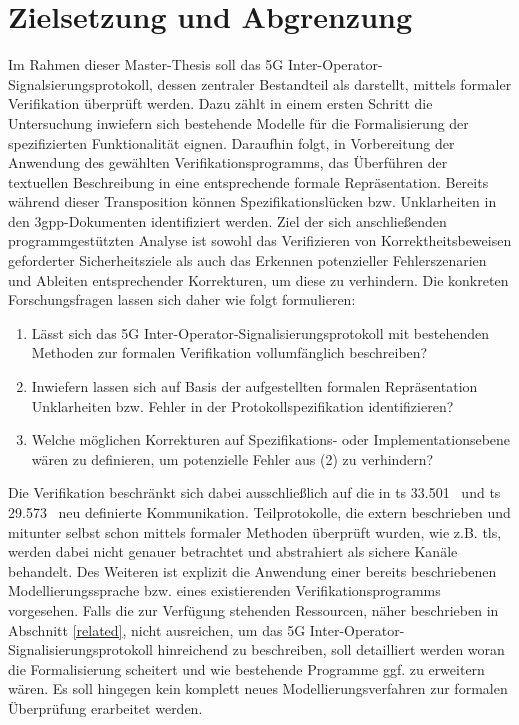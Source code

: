 \section{Zielsetzung und Abgrenzung}

Im Rahmen dieser Master-Thesis soll das 5G Inter-Operator-Signalsierungsprotokoll, dessen zentraler Bestandteil \gls{als} darstellt, mittels formaler Verifikation überprüft werden.
Dazu zählt in einem ersten Schritt die Untersuchung inwiefern sich bestehende Modelle für die Formalisierung der spezifizierten Funktionalität eignen.
Daraufhin folgt, in Vorbereitung der Anwendung des gewählten Verifikationsprogramms, das Überführen der textuellen Beschreibung in eine entsprechende formale Repräsentation.
Bereits während dieser Transposition können Spezifikationslücken bzw. Unklarheiten in den \gls{3gpp}-Dokumenten identifiziert werden.
Ziel der sich anschließenden programmgestützten Analyse ist sowohl das Verifizieren von Korrektheitsbeweisen geforderter Sicherheitsziele als auch das Erkennen potenzieller Fehlerszenarien und Ableiten entsprechender Korrekturen, um diese zu verhindern.
Die konkreten Forschungsfragen lassen sich daher wie folgt formulieren:

\begin{enumerate}[label=(\arabic*)]
    \item Lässt sich das 5G Inter-Operator-Signalisierungsprotokoll mit bestehenden Methoden zur formalen Verifikation vollumfänglich beschreiben?
    
    \item Inwiefern lassen sich auf Basis der aufgestellten formalen Repräsentation Unklarheiten bzw. Fehler in der Protokollspezifikation identifizieren?
    
    \item Welche möglichen Korrekturen auf Spezifikations- oder Implementationsebene wären zu definieren, um potenzielle Fehler aus (2) zu verhindern?
\end{enumerate}

Die Verifikation beschränkt sich dabei ausschließlich auf die in \gls{ts} 33.501~\cite{TS33501} und \gls{ts} 29.573~\cite{TS29573} neu definierte Kommunikation.
Teilprotokolle, die extern beschrieben und mitunter selbst schon mittels formaler Methoden überprüft wurden, wie z.B. \gls{tls}, werden dabei nicht genauer betrachtet und abstrahiert als sichere Kanäle behandelt.
Des Weiteren ist explizit die Anwendung einer bereits beschriebenen Modellierungssprache bzw. eines existierenden Verifikationsprogramms vorgesehen.
Falls die zur Verfügung stehenden Ressourcen, näher beschrieben in Abschnitt \ref{related}, nicht ausreichen, um das 5G Inter-Operator-Signalisierungsprotokoll hinreichend zu beschreiben, soll detailliert werden woran die Formalisierung scheitert und wie bestehende Programme ggf. zu erweitern wären.
Es soll hingegen kein komplett neues Modellierungsverfahren zur formalen Überprüfung erarbeitet werden.